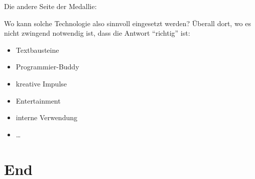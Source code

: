 \documentclass[aspectratio=169,usenames,dvipsnames]{beamer}
\begin{document}
\begin{frame}
\Large
Die andere Seite der Medallie:\normalsize\bigskip

Wo kann solche Technologie also sinnvoll eingesetzt werden? Überall dort, wo es nicht
zwingend notwendig ist, dass die Antwort ``richtig'' ist:\bigskip

\begin{itemize}
\item Textbausteine
\item Programmier-Buddy
\item kreative Impulse
\item Entertainment
\item interne Verwendung
\item \dots
\end{itemize}
\end{frame}


\section{End}
\end{document}
